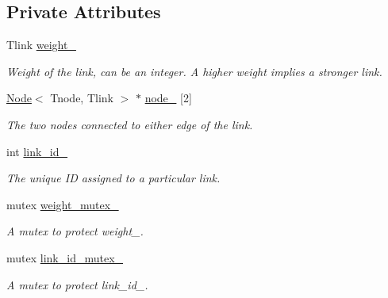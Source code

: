 \subsection*{Private Attributes}
\begin{DoxyCompactItemize}
\item 
\hypertarget{classLink_a4b070bc8755475c63a0cbeda4435a5a9}{Tlink \hyperlink{classLink_a4b070bc8755475c63a0cbeda4435a5a9}{weight\-\_\-}}\label{classLink_a4b070bc8755475c63a0cbeda4435a5a9}

\begin{DoxyCompactList}\small\item\em Weight of the link, can be an integer. A higher weight implies a stronger link. \end{DoxyCompactList}\item 
\hypertarget{classLink_aeb73083e229485a383509f87e0e0dca3}{\hyperlink{classNode}{Node}$<$ Tnode, Tlink $>$ $\ast$ \hyperlink{classLink_aeb73083e229485a383509f87e0e0dca3}{node\-\_\-} \mbox{[}2\mbox{]}}\label{classLink_aeb73083e229485a383509f87e0e0dca3}

\begin{DoxyCompactList}\small\item\em The two nodes connected to either edge of the link. \end{DoxyCompactList}\item 
\hypertarget{classLink_a628aea1d6ecfd27c1250e0369524f4e8}{int \hyperlink{classLink_a628aea1d6ecfd27c1250e0369524f4e8}{link\-\_\-id\-\_\-}}\label{classLink_a628aea1d6ecfd27c1250e0369524f4e8}

\begin{DoxyCompactList}\small\item\em The unique I\-D assigned to a particular link. \end{DoxyCompactList}\item 
\hypertarget{classLink_a9df48228aef5f47aabd78bf2ed9204e1}{mutex \hyperlink{classLink_a9df48228aef5f47aabd78bf2ed9204e1}{weight\-\_\-mutex\-\_\-}}\label{classLink_a9df48228aef5f47aabd78bf2ed9204e1}

\begin{DoxyCompactList}\small\item\em A mutex to protect weight\-\_\-. \end{DoxyCompactList}\item 
\hypertarget{classLink_a6347b18f7b457771e36ce2b2a269d87b}{mutex \hyperlink{classLink_a6347b18f7b457771e36ce2b2a269d87b}{link\-\_\-id\-\_\-mutex\-\_\-}}\label{classLink_a6347b18f7b457771e36ce2b2a269d87b}

\begin{DoxyCompactList}\small\item\em A mutex to protect link\-\_\-id\-\_\-. \end{DoxyCompactList}\end{DoxyCompactItemize}
